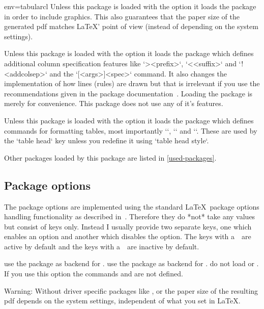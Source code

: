 \begin{tableobject}{env=tabular}{cl}
Unless this package is loaded with the  option
it loads the  package in order to include graphics.
This also guarantees that the paper size of the generated pdf matches \LaTeX' point of view (instead of depending on the system settings).~\autocite{texexchange_papersize}

Unless this package is loaded with the  option
it loads the  package which defines additional column specification features like `>{<prefix>}`, `<{<suffix>}` and `!{<addcolsep>}`
and the `\newcolumntype{<col>}[<args>]{<spec>}` command.
It also changes the implementation of how lines (rules) are drawn
but that is irrelevant if you use the recommendations given in the  package documentation~\autocite[section~2 ]{booktabs}.
Loading the  package is merely for convenience. This package does not use any of it's features.

Unless this package is loaded with the  option
it loads the  package which defines commands for formatting tables, most importantly `\toprule`, `\midrule` and `\bottomrule`.
These are used by the `table head` key unless you redefine it using `table head style`.

Other packages loaded by this package are listed in \cref{used-packages}.


\subsection{Package options}
\label{package-options}

The package options are implemented using the standard \LaTeX\ package options handling functionality as described in~\autocite{clsguide}.
Therefore they do *not* take any values but consist of keys only.
Instead I usually provide two separate keys, one which enables an option and another which disables the option.
The keys with a~\radioon\ are active by default and the keys with a~\radiooff\ are inactive by default.

 use the  package as backend for .
 use the  package as backend for .
 do not load  or .
   If you use this option the commands  and  are not defined.

   Warning: Without driver specific packages like ,  or  the paper size of the resulting pdf depends on the system settings, independent of what you set in \LaTeX. \autocite{texexchange_papersize}


\end{tableobject}
